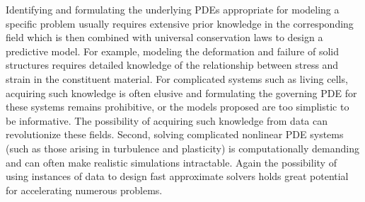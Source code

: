Identifying and formulating the underlying PDEs appropriate for modeling a specific problem usually requires extensive prior knowledge in the corresponding field which is then combined with universal conservation laws to design a predictive model. For example, modeling the deformation and failure of solid structures requires detailed knowledge of the relationship between stress and strain in the constituent material. For complicated systems such as living cells, acquiring such knowledge is often elusive and formulating the governing PDE for these systems remains prohibitive, or the models
proposed are too simplistic to be informative. The possibility of acquiring such knowledge from data can revolutionize these fields. 
Second, solving complicated nonlinear PDE systems (such as those arising in turbulence and plasticity) is computationally demanding and can often make realistic simulations intractable. Again the possibility of using instances of data to design fast approximate solvers holds great potential for accelerating numerous problems.

\iffalse
\subsection{Learning the Operator} We want to stress that learning the operator $\F$ is a more challenging task compared to finding the solution $u$ for a single equation. Most of the existing methods, ranging from traditional finite element methods (FEM), finite difference methods (FDM), to machine learning based physics-informed neural networks (PINNs) \citep{raissi2019physics}, they all aim to find $u$ for a single equation (i.e., single solving for a single $a$). On the other hand, we want to parameterize $\F$ as a mapping from $a\in\A$ to $u\in\U$.

Compared to PDE solvers such as FEM and PINNs, the neural operator learns the solution operator doesn't require to solve each equation separately. It immediately outputs the evaluation for any new query $a$. Therefore, it is usually used as a fast evaluator. For example, for inverse problem when one need to find some optimal material structures $a$, the neural operator can quickly evaluate input $a'$, combining with optimization methods to find $a' \to a$.
\fi 

